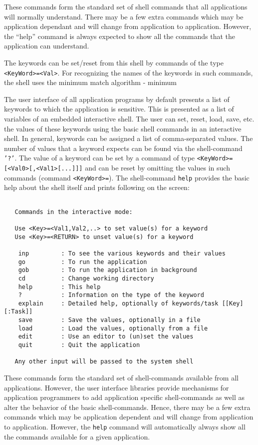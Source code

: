 \documentclass[11pt]{article}
\begin{document}
These commands form the standard set of shell commands that all
applications will normally understand.  There may be a few extra
commands which may be application dependant and will change from
application to application.  However, the ``help'' command is always
expected to show all the commands that the application can understand.

The keywords can be set/reset from this shell by commands of the type
{\tt <KeyWord>=<Val>}.  For recognizing the names of the keywords in
such commands, the shell uses the minimum match algorithm - minimum
\label{UI_CMDS}

The user interface of all application programs by default presents a
list of keywords to which the application is sensitive.  This is
presented as a list of variables of an embedded interactive shell.  The
user can set, reset, load, save, etc. the values of these keywords
using the basic shell commands in an interactive shell.  In general,
keywords can be assigned a list of comma-separated values.  The number
of values that a keyword expects can be found via the shell-command
{\tt '?'}.  The value of a keyword can be set by a command of type
{\tt <KeyWord>=[<Val0>[,<Val1>[...]]]}  and can be reset by omitting
the values in such commands (command {\tt <KeyWord>=}).  The
shell-command {\tt help} provides the basic help about the shell
itself and prints following on the screen:

\begin{verbatim}

   Commands in the interactive mode:

   Use <Key>=<Val1,Val2,..> to set value(s) for a keyword
   Use <Key>=<RETURN> to unset value(s) for a keyword

    inp         : To see the various keywords and their values
    go          : To run the application
    gob         : To run the application in background
    cd          : Change working directory
    help        : This help
    ?           : Information on the type of the keyword
    explain     : Detailed help, optionally of keywords/task [[Key][:Task]]
    save        : Save the values, optionally in a file
    load        : Load the values, optionally from a file
    edit        : Use an editor to (un)set the values
    quit        : Quit the application

   Any other input will be passed to the system shell

\end{verbatim}

These commands form the standard set of shell-commands available from
all applications.  However, the user interface libraries provide
mechanisms for application programmers to add application specific
shell-commands as well as alter the behavior of the basic
shell-commands.  Hence, there may be a few extra commands which
may be application dependent and will change from application to
application.  However, the {\tt help} command will automatically
always show all the commands available for a given application.
\end{document}
